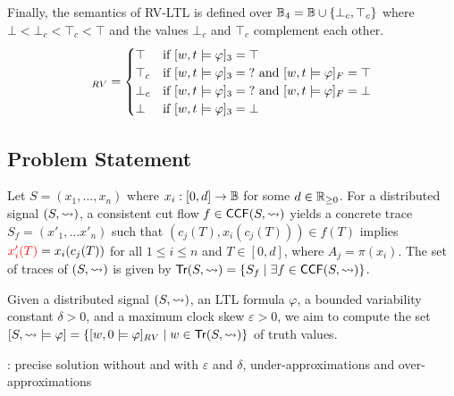 Finally, the semantics of RV-LTL is defined over $\mathbb{B}_4 = \mathbb{B} \cup \{\bot_c, \top_c \}$ where $\bot < \bot_c < \top_c < \top$ and the values $\bot_c$ and $\top_c$ complement each other.
\begin{align*}
	[w,t \models \varphi]_{RV} &= \begin{cases}
		\top &\text{if } [w,t \models \varphi]_3 = \top \\
		\top_c &\text{if } [w,t \models \varphi]_3 = \? \text{ and } [w,t \models \varphi]_F = \top \\
		\bot_c &\text{if } [w,t \models \varphi]_3 = \? \text{ and } [w,t \models \varphi]_F = \bot \\
		\bot &\text{if } [w,t \models \varphi]_3 = \bot \\
	\end{cases} \\
\end{align*}	

\subsection{Problem Statement}

Let $S = (x_1, \ldots, x_n)$ where $x_i : [0,d] \to \mathbb{B}$ for some $d \in \mathbb{R}_{\geq 0}$.
For a distributed signal $(S,{\rightsquigarrow})$, a consistent cut flow $f \in \mathsf{CCF}(S,{\rightsquigarrow})$ yields a concrete trace $S_f = (x'_1, \ldots x'_n)$ such that $(c_j(T), x_i(c_j(T))) \in f(T)$ implies $\textcolor{red}{x_i'(T)} = x_i(c_j(T))$ for all $1 \leq i \leq n$ and $T \in [0,d]$, where $A_j = \pi(x_i)$.
\alert{The set of traces of $(S,{\rightsquigarrow})$ is given by $\tr(S,{\hb}) = \{ S_f \st \exists f \in \CCF(S,{\hb})\}$.}


Given a distributed signal $(S, {\rightsquigarrow})$, an LTL formula $\varphi$, a bounded variability constant $\delta > 0$, and a maximum clock skew $\varepsilon > 0$, we aim to compute the set $[S, {\hb} \models \varphi] = \{ [w, 0 \models \varphi]_{RV} \st w \in \tr(S, {\hb}) \}$ of truth values.

\begin{example}
	\TODO: precise solution without and with $\varepsilon$ and $\delta$, under-approximations and over-approximations
\end{example}

